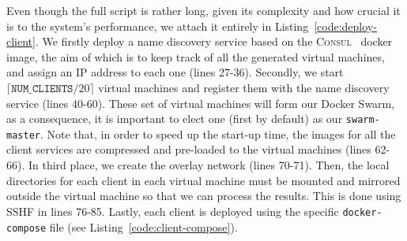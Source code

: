 Even though the full script is rather long, given its complexity and how crucial it is to the system's performance, we attach it entirely in Listing~\ref{code:deploy-client}.
We firstly deploy a name discovery service based on the \textsc{Consul}~\cite{consul-image} docker image, the aim of which is to keep track of all the generated virtual machines, and assign an IP address to each one (lines 27-36).
Secondly, we start $\lceil \texttt{NUM\_CLIENTS} / 20 \rceil$ virtual machines and register them with the name discovery service (lines 40-60).
These set of virtual machines will form our Docker Swarm, as a consequence, it is important to elect one (first by default) as our \texttt{swarm-master}.
Note that, in order to speed up the start-up time, the images for all the client services are compressed and pre-loaded to the virtual machines (lines 62-66).
In third place, we create the overlay network (lines 70-71).
Then, the local directories for each client in each virtual machine must be mounted and mirrored outside the virtual machine so that we can process the results.
This is done using SSHF in lines 76-85.
Lastly, each client is deployed using the specific \texttt{docker-compose} file (see Listing~\ref{code:client-compose}).
